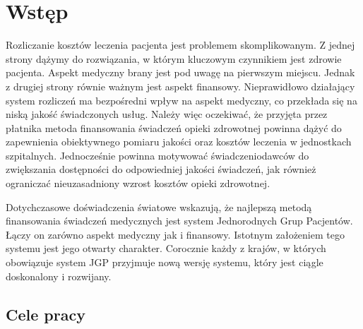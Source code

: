 \chapter{Wstęp}
\label{cha:wstep}

Rozliczanie kosztów leczenia pacjenta jest problemem skomplikowanym. Z jednej strony dążymy do rozwiązania, w którym kluczowym czynnikiem jest zdrowie pacjenta. Aspekt medyczny brany jest pod uwagę na pierwszym miejscu. Jednak z drugiej strony równie ważnym jest aspekt finansowy. Nieprawidłowo działający system rozliczeń ma bezpośredni wpływ na aspekt medyczny, co przekłada się na niską jakość świadczonych usług. Należy więc oczekiwać, że przyjęta przez płatnika metoda finansowania świadczeń opieki zdrowotnej powinna dążyć do zapewnienia obiektywnego pomiaru jakości oraz kosztów leczenia w jednostkach szpitalnych. Jednocześnie powinna motywować świadczeniodawców do zwiększania dostępności do odpowiedniej jakości świadczeń, jak również ograniczać nieuzasadniony wzrost kosztów opieki zdrowotnej.

Dotychczasowe doświadczenia światowe wskazują, że najlepszą metodą finansowania świadczeń medycznych jest system Jednorodnych Grup Pacjentów. Łączy on zarówno aspekt medyczny jak i finansowy. Istotnym założeniem tego systemu jest jego otwarty charakter. Corocznie każdy z krajów, w których obowiązuje system JGP przyjmuje nową wersję systemu, który jest ciągle doskonalony i rozwijany.


\section{Cele pracy}
\label{sec:celePracy}

